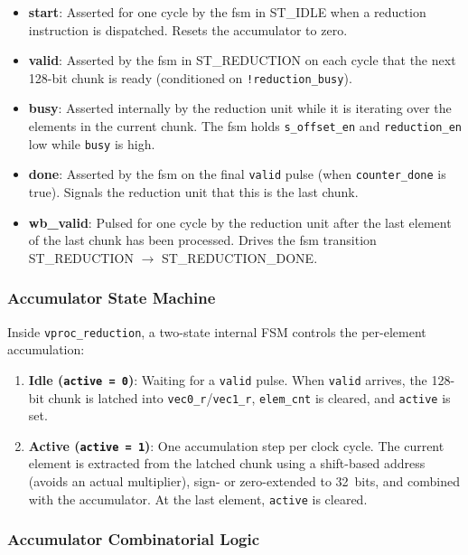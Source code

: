 \begin{itemize}
  \item \textbf{start}: Asserted for one cycle by the \gls{fsm} in ST\_IDLE when a
    reduction instruction is dispatched. Resets the accumulator to zero.
  \item \textbf{valid}: Asserted by the \gls{fsm} in ST\_REDUCTION on each cycle that
    the next 128-bit chunk is ready (conditioned on \texttt{!reduction\_busy}).
  \item \textbf{busy}: Asserted internally by the reduction unit while it is iterating
    over the elements in the current chunk. The \gls{fsm} holds \texttt{s\_offset\_en}
    and \texttt{reduction\_en} low while \texttt{busy} is high.
  \item \textbf{done}: Asserted by the \gls{fsm} on the final \texttt{valid} pulse
    (when \texttt{counter\_done} is true). Signals the reduction unit that this is
    the last chunk.
  \item \textbf{wb\_valid}: Pulsed for one cycle by the reduction unit after the last
    element of the last chunk has been processed. Drives the \gls{fsm} transition
    ST\_REDUCTION $\to$ ST\_REDUCTION\_DONE.
\end{itemize}

\subsubsection{Accumulator State Machine}

Inside \texttt{vproc\_reduction}, a two-state internal FSM controls the per-element
accumulation:

\begin{enumerate}
  \item \textbf{Idle (\texttt{active = 0})}: Waiting for a \texttt{valid} pulse. When
    \texttt{valid} arrives, the 128-bit chunk is latched into \texttt{vec0\_r}/\texttt{vec1\_r},
    \texttt{elem\_cnt} is cleared, and \texttt{active} is set.
  \item \textbf{Active (\texttt{active = 1})}: One accumulation step per clock cycle.
    The current element is extracted from the latched chunk using a shift-based address
    (avoids an actual multiplier), sign- or zero-extended to 32~bits, and combined with
    the accumulator. At the last element, \texttt{active} is cleared.
\end{enumerate}

\subsubsection{Accumulator Combinatorial Logic}

